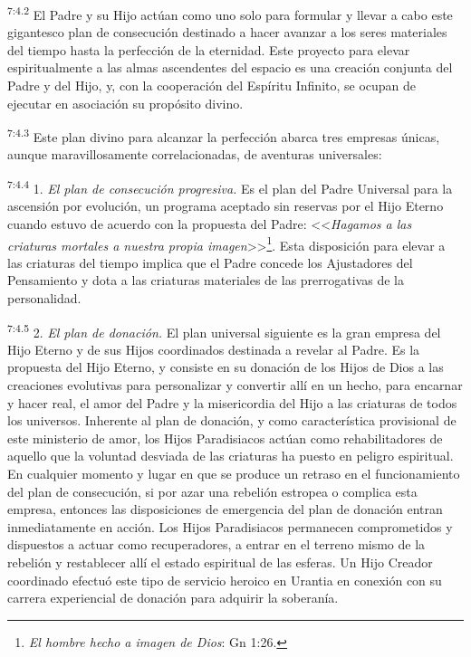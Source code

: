 \par
\textsuperscript{7:4.2} El Padre y su Hijo actúan como uno solo para formular y llevar a cabo este gigantesco plan de consecución destinado a hacer avanzar a los seres materiales del tiempo hasta la perfección de la eternidad. Este proyecto para elevar espiritualmente a las almas ascendentes del espacio es una creación conjunta del Padre y del Hijo, y, con la cooperación del Espíritu Infinito, se ocupan de ejecutar en asociación su propósito divino.

\par
\textsuperscript{7:4.3} Este plan divino para alcanzar la perfección abarca tres empresas únicas, aunque maravillosamente correlacionadas, de aventuras universales:

\par
\textsuperscript{7:4.4} 1. \textit{El plan de consecución progresiva.} Es el plan del Padre Universal para la ascensión por evolución, un programa aceptado sin reservas por el Hijo Eterno cuando estuvo de acuerdo con la propuesta del Padre: <<\textit{Hagamos a las criaturas mortales a nuestra propia imagen}>>\footnote{\textit{El hombre hecho a imagen de Dios}: Gn 1:26.}. Esta disposición para elevar a las criaturas del tiempo implica que el Padre concede los Ajustadores del Pensamiento y dota a las criaturas materiales de las prerrogativas de la personalidad.

\par
\textsuperscript{7:4.5} 2. \textit{El plan de donación.} El plan universal siguiente es la gran empresa del Hijo Eterno y de sus Hijos coordinados destinada a revelar al Padre. Es la propuesta del Hijo Eterno, y consiste en su donación de los Hijos de Dios a las creaciones evolutivas para personalizar y convertir allí en un hecho, para encarnar y hacer real, el amor del Padre y la misericordia del Hijo a las criaturas de todos los universos. Inherente al plan de donación, y como característica provisional de este ministerio de amor, los Hijos Paradisiacos actúan como rehabilitadores de aquello que la voluntad desviada de las criaturas ha puesto en peligro espiritual. En cualquier momento y lugar en que se produce un retraso en el funcionamiento del plan de consecución, si por azar una rebelión estropea o complica esta empresa, entonces las disposiciones de emergencia del plan de donación entran inmediatamente en acción. Los Hijos Paradisiacos permanecen comprometidos y dispuestos a actuar como recuperadores, a entrar en el terreno mismo de la rebelión y restablecer allí el estado espiritual de las esferas. Un Hijo Creador coordinado efectuó este tipo de servicio heroico en Urantia en conexión con su carrera experiencial de donación para adquirir la soberanía.

